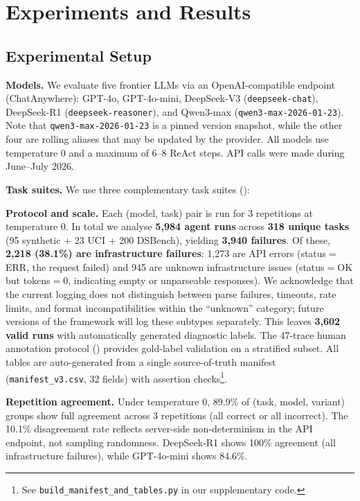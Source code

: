 \section{Experiments and Results}
\label{sec:exp}

\subsection{Experimental Setup}
\label{sec:setup}

\textbf{Models.} We evaluate five frontier LLMs via an OpenAI-compatible endpoint (ChatAnywhere): GPT-4o, GPT-4o-mini, DeepSeek-V3 (\texttt{deepseek-chat}), DeepSeek-R1 (\texttt{deepseek-reasoner}), and Qwen3-max (\texttt{qwen3-max-2026-01-23}). Note that \texttt{qwen3-max-2026-01-23} is a pinned version snapshot, while the other four are rolling aliases that may be updated by the provider. All models use temperature 0 and a maximum of 6--8 ReAct steps. API calls were made during June--July 2026.

\textbf{Task suites.} We use three complementary task suites ():



\textbf{Protocol and scale.} Each (model, task) pair is run for 3 repetitions at temperature 0. In total we analyse \textbf{5{,}984 agent runs} across \textbf{318 unique tasks} (95 synthetic $+$ 23 UCI $+$ 200 DSBench), yielding \textbf{3{,}940 failures}. Of these, \textbf{2{,}218 (38.1\%) are infrastructure failures}: 1{,}273 are API errors (status$=$ERR, the request failed) and 945 are unknown infrastructure issues (status$=$OK but tokens$=$0, indicating empty or unparseable responses). We acknowledge that the current logging does not distinguish between parse failures, timeouts, rate limits, and format incompatibilities within the ``unknown'' category; future versions of the framework will log these subtypes separately. This leaves \textbf{3{,}602 valid runs} with automatically generated diagnostic labels. The 47-trace human annotation protocol () provides gold-label validation on a stratified subset. All tables are auto-generated from a single source-of-truth manifest (\texttt{manifest\_v3.csv}, 32 fields) with assertion checks\footnote{See \texttt{build\_manifest\_and\_tables.py} in our supplementary code.}.

\textbf{Repetition agreement.} Under temperature 0, 89.9\% of (task, model, variant) groups show full agreement across 3 repetitions (all correct or all incorrect). The 10.1\% disagreement rate reflects server-side non-determinism in the API endpoint, not sampling randomness. DeepSeek-R1 shows 100\% agreement (all infrastructure failures), while GPT-4o-mini shows 84.6\%.

